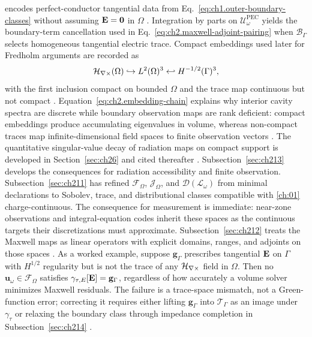 encodes perfect-conductor tangential data from
Eq.~\eqref{eq:ch1.outer-boundary-classes} without assuming \(\mathbf{E}=\mathbf{0}\) in
\(\Omega\) \cite{harrington2001}. Integration by parts on
\(\mathcal{U}_\omega^{\mathrm{PEC}}\) yields the boundary-term cancellation used in
Eq.~\eqref{eq:ch2.maxwell-adjoint-pairing} when \(\mathcal{B}_\Gamma\) selects
homogeneous tangential electric trace.
Compact embeddings used later for Fredholm arguments are recorded as
\begin{equation}
\label{eq:ch2.embedding-chain}
\mathcal{H}_{\nabla\times}(\Omega)\hookrightarrow L^{2}(\Omega)^{3}
\hookleftarrow H^{-1/2}(\Gamma)^{3},
\end{equation}
with the first inclusion compact on bounded \(\Omega\) and the trace map continuous
but not compact \cite{stratton1941}. Equation~\eqref{eq:ch2.embedding-chain}
explains why interior cavity spectra are discrete while boundary observation maps are
rank deficient: compact embeddings produce accumulating eigenvalues in volume,
whereas non-compact traces map infinite-dimensional field spaces to finite
observation vectors \cite{harrington2001}. The quantitative singular-value decay of
radiation maps on compact support is developed in Section~\ref{sec:ch26} and cited
thereafter \cite{stratton1941}. Subsection~\ref{sec:ch213} develops the
consequences for radiation accessibility and finite observation.
Subsection~\ref{sec:ch211} has refined \(\mathcal{F}_\Omega\), \(\mathcal{J}_\Omega\), and
\(\mathcal{D}(\mathcal{L}_\omega)\) from minimal declarations to Sobolev, trace, and
distributional classes compatible with \ref{ch:01} charge-continuous. The consequence
for measurement is immediate: near-zone observations and integral-equation codes inherit
these spaces as the continuous targets their discretizations must approximate.
Subsection~\ref{sec:ch212}
treats the Maxwell maps as linear operators with explicit domains, ranges, and adjoints on
those spaces \cite{stratton1941}.
As a worked example, suppose \(\mathbf{g}_\Gamma\) prescribes tangential \(\mathbf{E}\) on \(\Gamma\) with
\(H^{1/2}\) regularity but is not the trace of any \(\mathcal{H}_{\nabla\times}\) field in \(\Omega\).
Then no \(\mathbf{u}_\omega\in\mathcal{F}_\Omega\) satisfies
\(\gamma_{\tau,E}[\mathbf{E}]=\mathbf{g}_\Gamma\), regardless of how accurately a volume
solver minimizes Maxwell residuals. The failure is a trace-space mismatch, not a
Green-function error; correcting it requires either lifting \(\mathbf{g}_\Gamma\) into
\(\mathcal{T}_\Gamma\) as an image under \(\gamma_\tau\) or relaxing the boundary
class through impedance completion in Subsection~\ref{sec:ch214}
\cite{stratton1941}.
